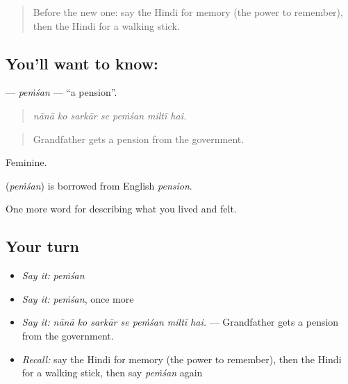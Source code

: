 \label{lesson:HI-C504-pemsan}



\begin{quote}
Before the new one: say the Hindi for memory (the power to remember), then the Hindi for a walking stick.
\end{quote}

\subsection*{You'll want to know: }
\textbf{} — \emph{peṁśan} — \textquotedblleft{}a pension\textquotedblright{}.

\begin{quote}
      
\end{quote}

\begin{quote}
\emph{nānā ko sarkār se peṁśan miltī hai.}
\end{quote}

\begin{quote}
Grandfather gets a pension from the government.
\end{quote}

Feminine.

\begin{cousinweb}
\textbf{} (\emph{peṁśan}) is borrowed from English \emph{pension}.
\end{cousinweb}

\begin{grammarlens}[title={What you've built}]
One more word for describing what you lived and felt.
\end{grammarlens}

\subsection*{Your turn}
\begin{itemize}
\raggedright
  \item \emph{Say it:} \emph{peṁśan}
  \item \emph{Say it:} \emph{peṁśan}, once more
  \item \emph{Say it:} \emph{nānā ko sarkār se peṁśan miltī hai.} — Grandfather gets a pension from the government.
  \item \emph{Recall:} say the Hindi for memory (the power to remember), then the Hindi for a walking stick, then say \emph{peṁśan} again
\end{itemize}

